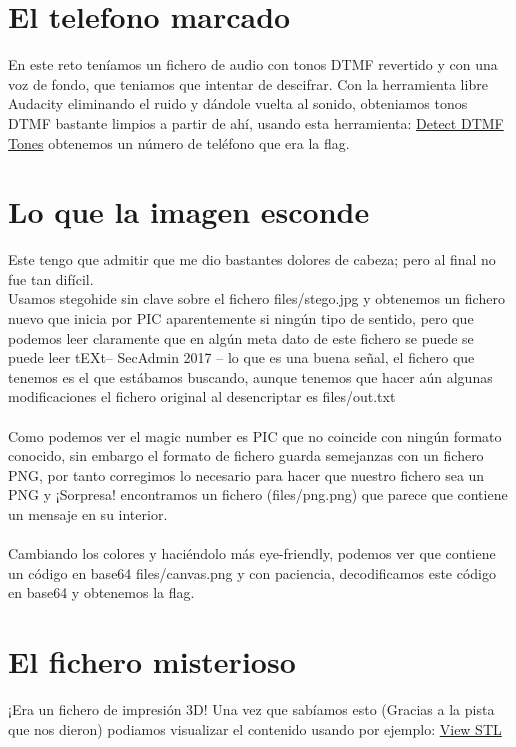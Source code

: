 \documentclass[11pt, spanish]{report}
\begin{document}
\section*{El telefono marcado}
En este reto teníamos un fichero de audio con tonos DTMF revertido y con una voz de fondo, que teniamos que intentar de descifrar. Con la herramienta libre Audacity eliminando el ruido y dándole vuelta al sonido, obteniamos tonos DTMF bastante limpios a partir de ahí, usando esta herramienta: \href{http://dialabc.com/sound/detect/}{Detect DTMF Tones} obtenemos un número de teléfono que era la flag.

\section*{Lo que la imagen esconde}
Este tengo que admitir que me dio bastantes dolores de cabeza; pero al final no fue tan difícil. \\
Usamos stegohide sin clave sobre el fichero files/stego.jpg y obtenemos un fichero nuevo que inicia por PIC aparentemente si ningún tipo de sentido, pero que podemos leer claramente que en algún meta dato de este fichero se puede se puede leer tEXt-- SecAdmin 2017 -- lo que es una buena señal, el fichero que tenemos es el que estábamos buscando, aunque tenemos que hacer aún algunas modificaciones el fichero original al desencriptar es files/out.txt \\ \\
Como podemos ver el magic number es PIC que no coincide con ningún formato conocido, sin embargo el formato de fichero guarda semejanzas con un fichero PNG, por tanto corregimos lo necesario para hacer que nuestro fichero sea un PNG y ¡Sorpresa! encontramos un fichero (files/png.png) que parece que contiene un mensaje en su interior. \\ \\
Cambiando los colores y haciéndolo más eye-friendly, podemos ver que contiene un código en base64 files/canvas.png y con paciencia, decodificamos este código en base64 y obtenemos la flag.

\section*{El fichero misterioso}
¡Era un fichero de impresión 3D! Una vez que sabíamos esto (Gracias a la pista que nos dieron) podiamos visualizar el contenido usando por ejemplo: \href{https://www.viewstl.com/}{View STL}

\newpage
\end{document}
